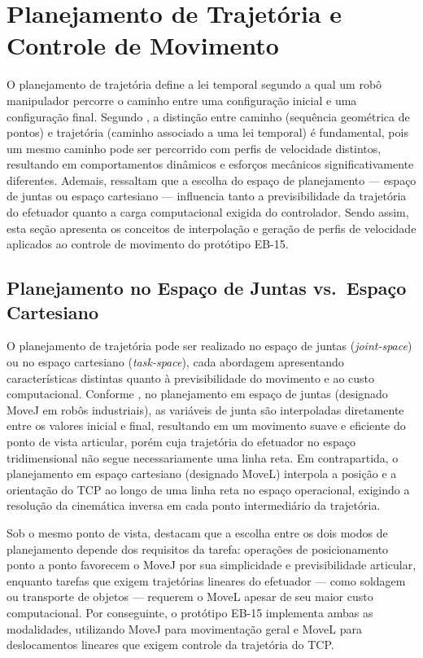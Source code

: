 \section{Planejamento de Trajetória e Controle de Movimento}

O planejamento de trajetória define a lei temporal segundo a qual um robô manipulador percorre o caminho entre uma configuração inicial e uma configuração final. Segundo , a distinção entre caminho (sequência geométrica de pontos) e trajetória (caminho associado a uma lei temporal) é fundamental, pois um mesmo caminho pode ser percorrido com perfis de velocidade distintos, resultando em comportamentos dinâmicos e esforços mecânicos significativamente diferentes. Ademais,  ressaltam que a escolha do espaço de planejamento — espaço de juntas ou espaço cartesiano — influencia tanto a previsibilidade da trajetória do efetuador quanto a carga computacional exigida do controlador. Sendo assim, esta seção apresenta os conceitos de interpolação e geração de perfis de velocidade aplicados ao controle de movimento do protótipo EB-15.

\subsection{Planejamento no Espaço de Juntas vs.\ Espaço Cartesiano}

O planejamento de trajetória pode ser realizado no espaço de juntas (\textit{joint-space}) ou no espaço cartesiano (\textit{task-space}), cada abordagem apresentando características distintas quanto à previsibilidade do movimento e ao custo computacional. Conforme , no planejamento em espaço de juntas (designado MoveJ em robôs industriais), as variáveis de junta são interpoladas diretamente entre os valores inicial e final, resultando em um movimento suave e eficiente do ponto de vista articular, porém cuja trajetória do efetuador no espaço tridimensional não segue necessariamente uma linha reta. Em contrapartida, o planejamento em espaço cartesiano (designado MoveL) interpola a posição e a orientação do TCP ao longo de uma linha reta no espaço operacional, exigindo a resolução da cinemática inversa em cada ponto intermediário da trajetória.

Sob o mesmo ponto de vista,  destacam que a escolha entre os dois modos de planejamento depende dos requisitos da tarefa: operações de posicionamento ponto a ponto favorecem o MoveJ por sua simplicidade e previsibilidade articular, enquanto tarefas que exigem trajetórias lineares do efetuador — como soldagem ou transporte de objetos — requerem o MoveL apesar de seu maior custo computacional. Por conseguinte, o protótipo EB-15 implementa ambas as modalidades, utilizando MoveJ para movimentação geral e MoveL para deslocamentos lineares que exigem controle da trajetória do TCP.

